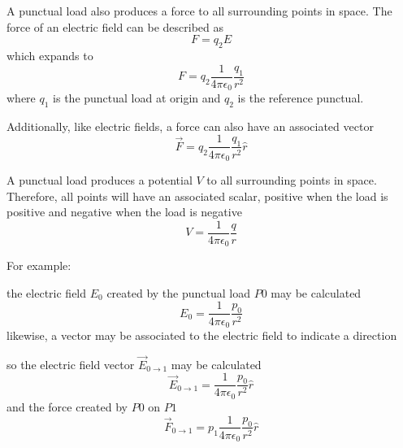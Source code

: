 \documentclass{article}
\begin{document}
A punctual load also produces a force to all surrounding points in space. The force of an electric
field can be described as
\[
	F = q_2 E
\]
which expands to
\[
	F = q_2 \frac{1}{4 \pi \epsilon_0} \frac{q_1}{r^2}
\]
where $q_1$ is the punctual load at origin and $q_2$ is the reference punctual.

Additionally, like electric fields, a force can also have an associated vector
\[
	\vec{F} = q_2 \frac{1}{4 \pi \epsilon_0} \frac{q_1}{r^2}\hat{r}
\]

A punctual load produces a potential $V$ to all surrounding points in space. Therefore, all
points will have an associated scalar, positive when the load is positive and negative when the load
is negative
\[
	V = \frac{1}{4\pi \epsilon_0}\frac{q}{r}
\]

\pagebreak
For example:
\begin{center}
\end{center}
the electric field $E_0$ created by the punctual load $P0$ may be calculated
\[
	E_0 = \frac{1}{4 \pi \epsilon_0} \frac{p_0}{r^2}
\]
likewise, a vector may be associated to the electric field to indicate a direction
\begin{center}
\end{center}
so the electric field vector $\vec{E}_{0 \to 1}$ may be calculated
\[
	\vec{E}_{0 \to 1} = \frac{1}{4 \pi \epsilon_0} \frac{p_0}{r^2}\hat{r}
\]
and the force created by $P0$ on $P1$
\[
	\vec{F}_{0 \to 1} = p_1 \frac{1}{4 \pi \epsilon_0} \frac{p_0}{r^2}\hat{r}
\]
\end{document}
